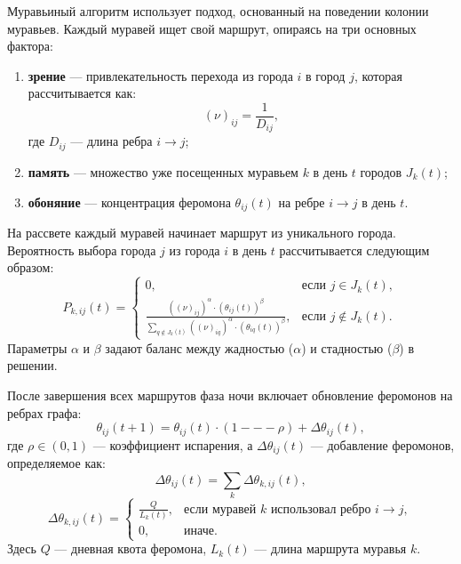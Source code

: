 Муравьиный алгоритм использует подход, основанный на поведении колонии муравьев. Каждый муравей ищет свой маршрут, опираясь на три основных фактора:

\begin{enumerate}
   \item \textbf{зрение} --- привлекательность перехода из города \(i\) в город \(j\), которая рассчитывается как:
   \begin{equation}\label{eq:vision}
   (\nu)_{ij} = \frac{1}{D_{ij}},
   \end{equation}
   где \(D_{ij}\) --- длина ребра \(i \rightarrow j\);

\item \textbf{память} --- множество уже посещенных муравьем \(k\) в день \(t\) городов \(J_k(t)\);

\item \textbf{обоняние} --- концентрация феромона \(\theta_{ij}(t)\) на ребре \(i \rightarrow j\) в день \(t\).
\end{enumerate}

На рассвете каждый муравей начинает маршрут из уникального города. Вероятность выбора города \(j\) из города \(i\) в день \(t\) рассчитывается следующим образом:
\begin{equation}\label{eq:probability}
P_{k,ij}(t) =
\begin{cases}
0, & \text{если } j \in J_k(t), \\
\frac{((\nu)_{ij})^\alpha \cdot (\theta_{ij}(t))^\beta}{\sum_{q \notin J_k(t)} ((\nu)_{iq})^\alpha \cdot (\theta_{iq}(t))^\beta}, & \text{если } j \notin J_k(t).
\end{cases}
\end{equation}
Параметры \(\alpha\) и \(\beta\) задают баланс между жадностью (\(\alpha\)) и стадностью (\(\beta\)) в решении.

После завершения всех маршрутов фаза ночи включает обновление феромонов на ребрах графа:
\begin{equation}\label{eq:pheromone_update}
\theta_{ij}(t+1) = \theta_{ij}(t) \cdot (1 --- \rho) + \Delta \theta_{ij}(t),
\end{equation}
где \(\rho \in (0, 1)\) --- коэффициент испарения, а \(\Delta \theta_{ij}(t)\) --- добавление феромонов, определяемое как:
\begin{equation}\label{eq:delta_pheromone}
\Delta \theta_{ij}(t) = \sum_{k} \Delta \theta_{k,ij}(t),
\end{equation}
\begin{equation}\label{eq:pheromone_individual}
\Delta \theta_{k,ij}(t) =
\begin{cases}
\frac{Q}{L_k(t)}, & \text{если муравей } k \text{ использовал ребро } i \rightarrow j, \\
0, & \text{иначе.}
\end{cases}
\end{equation}
Здесь \(Q\) --- дневная квота феромона, \(L_k(t)\) --- длина маршрута муравья \(k\).

